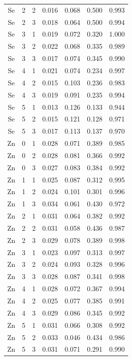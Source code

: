 \documentclass[ms, hidelinks]{uncgdissertationexp3}
\theoremstyle{plain}
\theoremstyle{definition}
\theoremstyle{remark}
\begin{document}
\begin{longtable}{ccccccc}
  Se & 2 & 2 & 0.016 & 0.068 & 0.500 & 0.993\\
  \rowcolor{gray!6}  Se & 2 & 3 & 0.018 & 0.064 & 0.500 & 0.994\\
  Se & 3 & 1 & 0.019 & 0.072 & 0.320 & 1.000\\
  \rowcolor{gray!6}  Se & 3 & 2 & 0.022 & 0.068 & 0.335 & 0.989\\
  Se & 3 & 3 & 0.017 & 0.074 & 0.345 & 0.990\\
  \rowcolor{gray!6}  Se & 4 & 1 & 0.021 & 0.074 & 0.234 & 0.997\\
  Se & 4 & 2 & 0.015 & 0.103 & 0.236 & 0.983\\
  \rowcolor{gray!6}  Se & 4 & 3 & 0.019 & 0.091 & 0.235 & 0.994\\
  Se & 5 & 1 & 0.013 & 0.126 & 0.133 & 0.944\\
  \rowcolor{gray!6}  Se & 5 & 2 & 0.015 & 0.121 & 0.128 & 0.971\\
  Se & 5 & 3 & 0.017 & 0.113 & 0.137 & 0.970\\
  \rowcolor{gray!6}  Zn & 0 & 1 & 0.028 & 0.071 & 0.389 & 0.985\\
  Zn & 0 & 2 & 0.028 & 0.081 & 0.366 & 0.992\\
  \rowcolor{gray!6}  Zn & 0 & 3 & 0.027 & 0.083 & 0.384 & 0.992\\
  Zn & 1 & 1 & 0.025 & 0.087 & 0.312 & 0.995\\
  \rowcolor{gray!6}  Zn & 1 & 2 & 0.024 & 0.101 & 0.301 & 0.996\\
  Zn & 1 & 3 & 0.034 & 0.061 & 0.430 & 0.972\\
  \rowcolor{gray!6}  Zn & 2 & 1 & 0.031 & 0.064 & 0.382 & 0.992\\
  Zn & 2 & 2 & 0.031 & 0.058 & 0.436 & 0.987\\
  \rowcolor{gray!6}  Zn & 2 & 3 & 0.029 & 0.078 & 0.389 & 0.998\\
  Zn & 3 & 1 & 0.023 & 0.097 & 0.313 & 0.997\\
  \rowcolor{gray!6}  Zn & 3 & 2 & 0.024 & 0.093 & 0.328 & 0.996\\
  Zn & 3 & 3 & 0.028 & 0.087 & 0.341 & 0.998\\
  \rowcolor{gray!6}  Zn & 4 & 1 & 0.028 & 0.072 & 0.367 & 0.994\\
  Zn & 4 & 2 & 0.025 & 0.077 & 0.385 & 0.991\\
  \rowcolor{gray!6}  Zn & 4 & 3 & 0.029 & 0.086 & 0.345 & 0.992\\
  Zn & 5 & 1 & 0.031 & 0.066 & 0.308 & 0.992\\
  \rowcolor{gray!6}  Zn & 5 & 2 & 0.033 & 0.046 & 0.434 & 0.986\\
  Zn & 5 & 3 & 0.031 & 0.071 & 0.291 & 0.990\\*
  \end{longtable}
\end{document}
